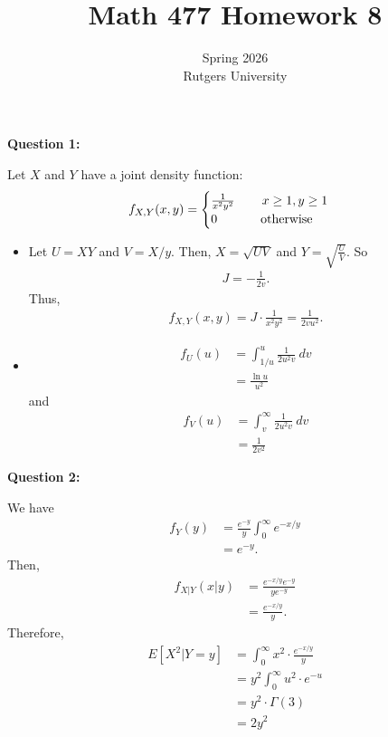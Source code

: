 \documentclass[12pt]{article}
\title{Math 477 Homework 8}
\author{Spring 2026 \\ Rutgers University}
\begin{document}
\maketitle

\noindent{}\textbf{Question 1:}

Let $X$ and $Y$ have a joint density function:
\begin{align*}
    f_{X,Y}(x,y) = \begin{cases}
                       \frac{1}{x^2y^2} \hspace{5ex} x \geq 1, y \geq 1 \\
                       0 \hspace{8ex} \text{otherwise}
                   \end{cases}
\end{align*}
\begin{itemize}
    \item [(a)]
          Let $U = XY$ and $V = X/y$. Then, $X = \sqrt{UV}$ and $Y = \sqrt{\frac{U}{V}}$.
          So
          \begin{align*}
              J = -\frac{1}{2v}.
          \end{align*}
          Thus,
          \begin{align*}
              f_{X,Y}(x,y) = J \cdot \frac{1}{x^2y^2} = \frac{1}{2vu^2}.
          \end{align*}
    \item  [(b)]
          \begin{align*}
              f_U(u) & = \int_{1/u}^{u} \frac{1}{2u^2v} ~dv \\
                     & = \frac{\ln{u}}{u^2}
          \end{align*}
          and
          \begin{align*}
              f_V(u) & = \int_{v}^{\infty} \frac{1}{2u^2v} ~dv \\
                     & = \frac{1}{2v^2}
          \end{align*}
\end{itemize}

\noindent{}\textbf{Question 2:}

We have
\begin{align*}
    f_Y(y) & = \frac{e^{-y}}{y}\int_{0}^{\infty} e^{-x/y} \\
           & = e^{-y}.
\end{align*}
Then,
\begin{align*}
    f_{X | Y}(x | y) & = \frac{e^{-x/y}e^{-y}}{ye^{-y}} \\
                     & = \frac{e^{-x/y}}{y}.
\end{align*}
Therefore,
\begin{align*}
    E[X^2 | Y = y] & = \int_{0}^{\infty} x^2 \cdot \frac{e^{-x/y}}{y} \\
                   & = y^2 \int_{0}^{\infty}  u^2 \cdot e^{-u}        \\
                   & = y^2 \cdot \Gamma(3)                            \\
                   & = 2y^2
\end{align*}
\end{document}
